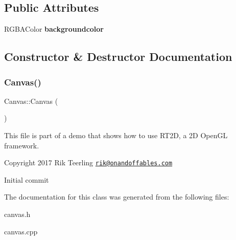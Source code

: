 \subsection*{Public Attributes}
\begin{DoxyCompactItemize}
\item 
\mbox{\label{class_canvas_a8690c36b9534c872443b9df1acdc19f6}} 
R\+G\+B\+A\+Color {\bfseries backgroundcolor}
\end{DoxyCompactItemize}


\subsection{Constructor \& Destructor Documentation}
\mbox{\label{class_canvas_a5fce53f080ad6540094901f9768805a8}} 
\subsubsection{\texorpdfstring{Canvas()}{Canvas()}}
{\footnotesize\ttfamily Canvas\+::\+Canvas (\begin{DoxyParamCaption}{ }\end{DoxyParamCaption})}

This file is part of a demo that shows how to use R\+T2D, a 2D Open\+GL framework.


\begin{DoxyItemize}
\item Copyright 2017 Rik Teerling \href{mailto:rik@onandoffables.com}{\tt rik@onandoffables.\+com}
\begin{DoxyItemize}
\item Initial commit 
\end{DoxyItemize}
\end{DoxyItemize}

The documentation for this class was generated from the following files\+:\begin{DoxyCompactItemize}
\item 
canvas.\+h\item 
canvas.\+cpp\end{DoxyCompactItemize}
